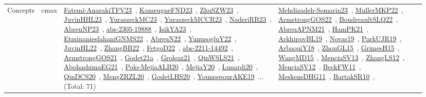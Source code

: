 {\begin{longtable}{lp{3cm}>{\raggedright\arraybackslash}p{6cm}>{\raggedright\arraybackslash}p{6cm}>{\raggedright\arraybackslash}p{8cm}}
\index{cmax}\index{Concepts!cmax}Concepts & cmax & \href{../works/Fatemi-AnarakiTFV23.pdf}{Fatemi-AnarakiTFV23}~\cite{Fatemi-AnarakiTFV23}, \href{../works/KameugneFND23.pdf}{KameugneFND23}~\cite{KameugneFND23}, \href{../works/ZhuSZW23.pdf}{ZhuSZW23}~\cite{ZhuSZW23}, \href{../works/JuvinHHL23.pdf}{JuvinHHL23}~\cite{JuvinHHL23}, \href{../works/YuraszeckMC23.pdf}{YuraszeckMC23}~\cite{YuraszeckMC23}, \href{../works/YuraszeckMCCR23.pdf}{YuraszeckMCCR23}~\cite{YuraszeckMCCR23}, \href{../works/NaderiRR23.pdf}{NaderiRR23}~\cite{NaderiRR23}, \href{../works/AbreuNP23.pdf}{AbreuNP23}~\cite{AbreuNP23}, \href{../works/abs-2305-19888.pdf}{abs-2305-19888}~\cite{abs-2305-19888}, \href{../works/IsikYA23.pdf}{IsikYA23}~\cite{IsikYA23}, \href{../works/EtminaniesfahaniGNMS22.pdf}{EtminaniesfahaniGNMS22}~\cite{EtminaniesfahaniGNMS22}, \href{../works/AbreuN22.pdf}{AbreuN22}~\cite{AbreuN22}, \href{../works/YunusogluY22.pdf}{YunusogluY22}~\cite{YunusogluY22}, \href{../works/JuvinHL22.pdf}{JuvinHL22}~\cite{JuvinHL22}, \href{../works/ZhangBB22.pdf}{ZhangBB22}~\cite{ZhangBB22}, \href{../works/FetgoD22.pdf}{FetgoD22}~\cite{FetgoD22}, \href{../works/abs-2211-14492.pdf}{abs-2211-14492}~\cite{abs-2211-14492}, \href{../works/ArmstrongGOS21.pdf}{ArmstrongGOS21}~\cite{ArmstrongGOS21}, \href{../works/Godet21a.pdf}{Godet21a}~\cite{Godet21a}, \href{../works/Groleaz21.pdf}{Groleaz21}~\cite{Groleaz21}, \href{../works/QinWSLS21.pdf}{QinWSLS21}~\cite{QinWSLS21}, \href{../works/AbohashimaEG21.pdf}{AbohashimaEG21}~\cite{AbohashimaEG21}, \href{../works/Polo-MejiaALB20.pdf}{Polo-MejiaALB20}~\cite{Polo-MejiaALB20}, \href{../works/MejiaY20.pdf}{MejiaY20}~\cite{MejiaY20}, \href{../works/Lunardi20.pdf}{Lunardi20}~\cite{Lunardi20}, \href{../works/QinDCS20.pdf}{QinDCS20}~\cite{QinDCS20}, \href{../works/MengZRZL20.pdf}{MengZRZL20}~\cite{MengZRZL20}, \href{../works/GodetLHS20.pdf}{GodetLHS20}~\cite{GodetLHS20}, \href{../works/YounespourAKE19.pdf}{YounespourAKE19}~\cite{YounespourAKE19}... (Total: 71) & \href{../works/Mehdizadeh-Somarin23.pdf}{Mehdizadeh-Somarin23}~\cite{Mehdizadeh-Somarin23}, \href{../works/MullerMKP22.pdf}{MullerMKP22}~\cite{MullerMKP22}, \href{../works/ArmstrongGOS22.pdf}{ArmstrongGOS22}~\cite{ArmstrongGOS22}, \href{../works/BoudreaultSLQ22.pdf}{BoudreaultSLQ22}~\cite{BoudreaultSLQ22}, \href{../works/AbreuAPNM21.pdf}{AbreuAPNM21}~\cite{AbreuAPNM21}, \href{../works/HamPK21.pdf}{HamPK21}~\cite{HamPK21}, \href{../works/ArkhipovBL19.pdf}{ArkhipovBL19}~\cite{ArkhipovBL19}, \href{../works/Novas19.pdf}{Novas19}~\cite{Novas19}, \href{../works/ParkUJR19.pdf}{ParkUJR19}~\cite{ParkUJR19}, \href{../works/ArbaouiY18.pdf}{ArbaouiY18}~\cite{ArbaouiY18}, \href{../works/ZhouGL15.pdf}{ZhouGL15}~\cite{ZhouGL15}, \href{../works/GrimesH15.pdf}{GrimesH15}~\cite{GrimesH15}, \href{../works/WangMD15.pdf}{WangMD15}~\cite{WangMD15}, \href{../works/MenciaSV13.pdf}{MenciaSV13}~\cite{MenciaSV13}, \href{../works/ZhangLS12.pdf}{ZhangLS12}~\cite{ZhangLS12}, \href{../works/MenciaSV12.pdf}{MenciaSV12}~\cite{MenciaSV12}, \href{../works/BeckFW11.pdf}{BeckFW11}~\cite{BeckFW11}, \href{../works/MeskensDHG11.pdf}{MeskensDHG11}~\cite{MeskensDHG11}, \href{../works/BartakSR10.pdf}{BartakSR10}~\cite{BartakSR10}, 
\end{longtable}}
